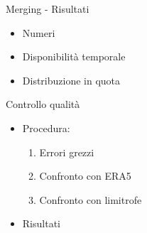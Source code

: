 \begin{frame}{Merging - Risultati}
  \begin{itemize}
    \item Numeri
    \item Disponibilità temporale
    \item Distribuzione in quota
  \end{itemize}
\end{frame}

\begin{frame}{Controllo qualità}
  \begin{itemize}
    \item Procedura:
      \begin{enumerate}
        \item Errori grezzi
        \item Confronto con ERA5
        \item Confronto con limitrofe
      \end{enumerate}
    \item Risultati
  \end{itemize}
\end{frame}